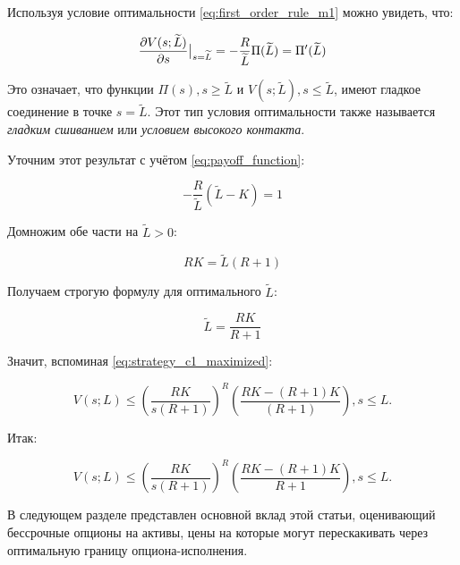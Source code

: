 \documentclass[a4paper,12pt]{article}
\theoremstyle{definition}
\newcommand{\at}[2][]{#1|_{#2}}
\begin{document}
Используя условие оптимальности \eqref{eq:first_order_rule_m1} можно увидеть, что:

\begin{equation}\label{eq:smooth_pasting_condition_m1}
    \pdv{V(s; \widetilde{L})}{s}\at[\big]{s=\widetilde{L}} = -\frac{R}{\widetilde{L}} \Pi(\widetilde{L}) = \Pi'(\widetilde{L})
\end{equation}

Это означает, что функции $\Pi(s), s \ge \widetilde{L}$ и $V(s; \widetilde{L}), s \le \widetilde{L}$, имеют гладкое соединение в точке $s = \widetilde{L}$. Этот тип условия оптимальности также называется \textit{гладким сшиванием} или \textit{условием высокого контакта}.

Уточним этот результат с учётом \eqref{eq:payoff_function}:

\begin{equation*}
    -\frac{R}{\widetilde{L}} (\widetilde{L} - K) = 1
\end{equation*}

Домножим обе части на $\tilde{L} > 0$:

\begin{equation*}
    R K = \widetilde{L} (R + 1)
\end{equation*}

Получаем строгую формулу для оптимального $\tilde{L}$:

\begin{equation}\label{eq:model1_tilde_l}
    \widetilde{L} =  \frac{R K}{R + 1}
\end{equation}

Значит, вспоминая \eqref{eq:strategy_c1_maximized}:

\begin{equation*}
V(s; L) \le \left(\frac{R K}{s (R + 1)}\right)^{R} (\frac{R K - (R + 1) K}{(R + 1)}), s \le L.
\end{equation*}

Итак:

\begin{equation}\label{eq:strategy_c1_estimation}
V(s; L) \le \left(\frac{R K}{s (R + 1)}\right)^{R} \left(\frac{R K - (R + 1) K}{R + 1}\right), s \le L.
\end{equation}

В следующем разделе представлен основной вклад этой статьи, оценивающий бессрочные опционы на активы, цены на которые могут перескакивать через оптимальную границу опциона-исполнения.

\end{document}

